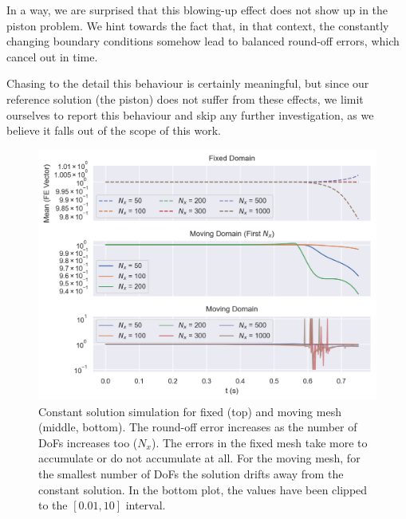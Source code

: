 \documentclass[../../thesis.tex]{subfiles}
\begin{document}
In a way, we are surprised that this blowing-up effect does not show up in the piston problem.
We hint towards the fact that, in that context, the constantly changing boundary conditions
somehow lead to balanced round-off errors, which cancel out in time.

Chasing to the detail this behaviour is certainly meaningful, 
but since our reference solution (the piston) does not suffer from these effects,
we limit ourselves to report this behaviour and skip any further investigation, 
as we believe it falls out of the scope of this work. 

\newpage
\begin{figure}[h]
    \centering
    \includegraphics[width=1\columnwidth]{research_project/piston/figures/ale_effect/mean_fe_comparison_constant_solution.png}
    \caption{Constant solution simulation for fixed (top) and moving mesh (middle, bottom).
    The round-off error increases as the number of DoFs increases too ($N_x$). 
    The errors in the fixed mesh take more to accumulate or do not accumulate at all.
    For the moving mesh, for the smallest number of DoFs the solution drifts away from the constant solution.
    In the bottom plot, the values have been clipped to the $[0.01, 10]$ interval.}
    \label{fig:ale_effect_constant_solution}
\end{figure}
\end{document}
